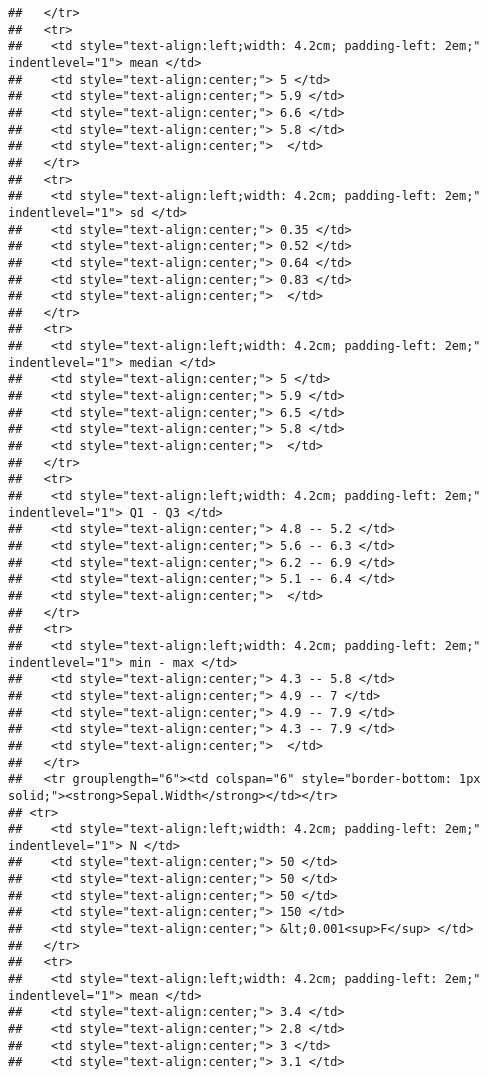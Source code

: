 \documentclass[
]{article}
\begin{document}
\begin{verbatim}
##   </tr>
##   <tr>
##    <td style="text-align:left;width: 4.2cm; padding-left: 2em;" indentlevel="1"> mean </td>
##    <td style="text-align:center;"> 5 </td>
##    <td style="text-align:center;"> 5.9 </td>
##    <td style="text-align:center;"> 6.6 </td>
##    <td style="text-align:center;"> 5.8 </td>
##    <td style="text-align:center;">  </td>
##   </tr>
##   <tr>
##    <td style="text-align:left;width: 4.2cm; padding-left: 2em;" indentlevel="1"> sd </td>
##    <td style="text-align:center;"> 0.35 </td>
##    <td style="text-align:center;"> 0.52 </td>
##    <td style="text-align:center;"> 0.64 </td>
##    <td style="text-align:center;"> 0.83 </td>
##    <td style="text-align:center;">  </td>
##   </tr>
##   <tr>
##    <td style="text-align:left;width: 4.2cm; padding-left: 2em;" indentlevel="1"> median </td>
##    <td style="text-align:center;"> 5 </td>
##    <td style="text-align:center;"> 5.9 </td>
##    <td style="text-align:center;"> 6.5 </td>
##    <td style="text-align:center;"> 5.8 </td>
##    <td style="text-align:center;">  </td>
##   </tr>
##   <tr>
##    <td style="text-align:left;width: 4.2cm; padding-left: 2em;" indentlevel="1"> Q1 - Q3 </td>
##    <td style="text-align:center;"> 4.8 -- 5.2 </td>
##    <td style="text-align:center;"> 5.6 -- 6.3 </td>
##    <td style="text-align:center;"> 6.2 -- 6.9 </td>
##    <td style="text-align:center;"> 5.1 -- 6.4 </td>
##    <td style="text-align:center;">  </td>
##   </tr>
##   <tr>
##    <td style="text-align:left;width: 4.2cm; padding-left: 2em;" indentlevel="1"> min - max </td>
##    <td style="text-align:center;"> 4.3 -- 5.8 </td>
##    <td style="text-align:center;"> 4.9 -- 7 </td>
##    <td style="text-align:center;"> 4.9 -- 7.9 </td>
##    <td style="text-align:center;"> 4.3 -- 7.9 </td>
##    <td style="text-align:center;">  </td>
##   </tr>
##   <tr grouplength="6"><td colspan="6" style="border-bottom: 1px solid;"><strong>Sepal.Width</strong></td></tr>
## <tr>
##    <td style="text-align:left;width: 4.2cm; padding-left: 2em;" indentlevel="1"> N </td>
##    <td style="text-align:center;"> 50 </td>
##    <td style="text-align:center;"> 50 </td>
##    <td style="text-align:center;"> 50 </td>
##    <td style="text-align:center;"> 150 </td>
##    <td style="text-align:center;"> &lt;0.001<sup>F</sup> </td>
##   </tr>
##   <tr>
##    <td style="text-align:left;width: 4.2cm; padding-left: 2em;" indentlevel="1"> mean </td>
##    <td style="text-align:center;"> 3.4 </td>
##    <td style="text-align:center;"> 2.8 </td>
##    <td style="text-align:center;"> 3 </td>
##    <td style="text-align:center;"> 3.1 </td>

\end{verbatim}
\end{document}
